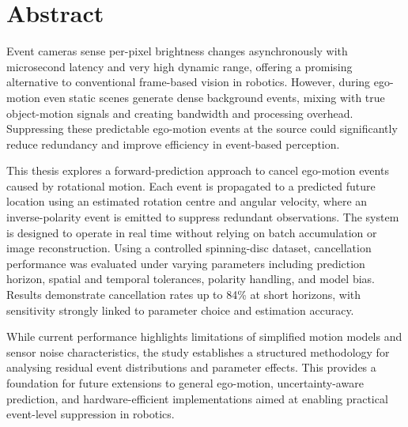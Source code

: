 \chapter*{Abstract}

Event cameras sense per-pixel brightness changes asynchronously with microsecond latency and very high dynamic range, offering a promising alternative to conventional frame-based vision in robotics. However, during ego-motion even static scenes generate dense background events, mixing with true object-motion signals and creating bandwidth and processing overhead. Suppressing these predictable ego-motion events at the source could significantly reduce redundancy and improve efficiency in event-based perception.

This thesis explores a forward-prediction approach to cancel ego-motion events caused by rotational motion. Each event is propagated to a predicted future location using an estimated rotation centre and angular velocity, where an inverse-polarity event is emitted to suppress redundant observations. The system is designed to operate in real time without relying on batch accumulation or image reconstruction. Using a controlled spinning-disc dataset, cancellation performance was evaluated under varying parameters including prediction horizon, spatial and temporal tolerances, polarity handling, and model bias. Results demonstrate cancellation rates up to 84\% at short horizons, with sensitivity strongly linked to parameter choice and estimation accuracy. 

While current performance highlights limitations of simplified motion models and sensor noise characteristics, the study establishes a structured methodology for analysing residual event distributions and parameter effects. This provides a foundation for future extensions to general ego-motion, uncertainty-aware prediction, and hardware-efficient implementations aimed at enabling practical event-level suppression in robotics.
